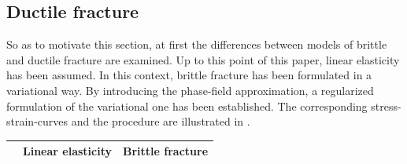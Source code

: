 \subsection{Ductile fracture} \label{sec:ductile_frac}
So as to motivate this section, at first the differences between models of brittle and ductile fracture are examined. Up to this point of this paper, linear elasticity has been assumed. In this context, brittle fracture has been formulated in a variational way. By introducing the phase-field approximation, a regularized formulation of the variational one has been established. The corresponding stress-strain-curves and the procedure are illustrated in .
\begin{table}[!ht]
	\begin{center}
	\begin{tabular}{|c||c|c|c|}
		\cline{2-4}
			\multicolumn{1}{c||}{}& Linear elasticity & \multicolumn{2}{c|}{Brittle fracture} \\
 		\hline\hline

\end{tabular}
\end{center}
\end{table}
